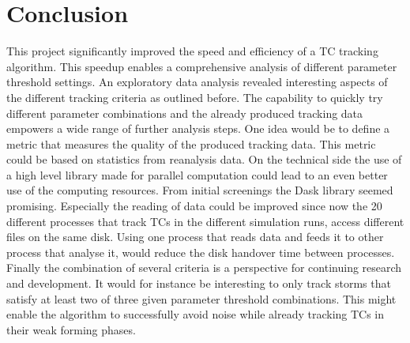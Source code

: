 \chapter{Conclusion}\label{sec:conclusion}
This project significantly improved the speed and efficiency of a TC tracking algorithm. This speedup enables a comprehensive analysis of different parameter threshold settings. An exploratory data analysis revealed interesting aspects of the different tracking criteria as outlined before. The capability to quickly try different parameter combinations and the already produced tracking data empowers a wide range of further analysis steps. One idea would be to define a metric that measures the quality of the produced tracking data. This metric could be based on statistics from reanalysis data. \newline
On the technical side the use of a high level library made for parallel computation could lead to an even better use of the computing resources. From initial screenings the Dask library \cite{dask} seemed promising. Especially the reading of data could be improved since now the 20 different processes that track TCs in the different simulation runs, access different files on the same disk. Using one process that reads data and feeds it to other process that analyse it, would reduce the disk handover time between processes.\newline
Finally the combination of several criteria is a perspective for continuing research and development. It would for instance be interesting to only track storms that satisfy at least two of three given parameter threshold combinations. This might enable the algorithm to successfully avoid noise while already tracking TCs in their weak forming phases.
